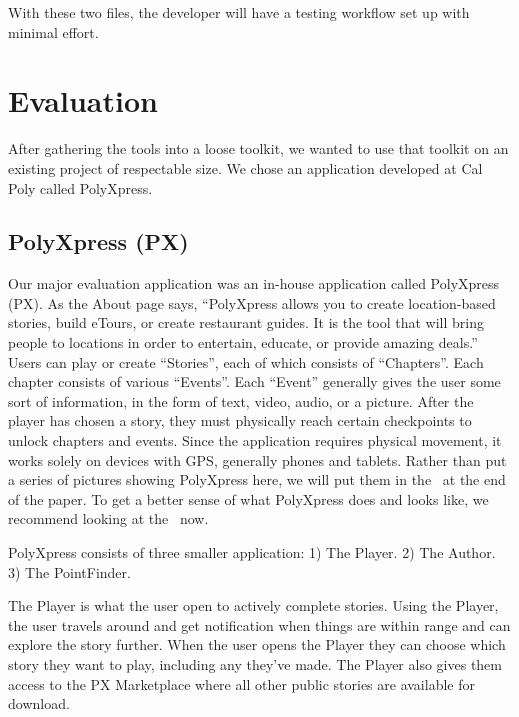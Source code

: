 \documentclass[12pt]{ucthesis}
\begin{document}
With these two files, the developer will have a testing workflow set up with minimal effort.


\chapter{Evaluation}
After gathering the tools into a loose toolkit, we wanted to use that toolkit on an existing project of respectable size. We chose an application developed at Cal Poly called PolyXpress.

\section{PolyXpress (PX)}
Our major evaluation application was an in-house application called PolyXpress (PX)\cite{PX}. As the About page says, ``PolyXpress allows you to create location-based stories, build eTours, or create restaurant guides. It is the tool that will bring people to locations in order to entertain, educate, or provide amazing deals.''\cite{PX} Users can play or create ``Stories'', each of which consists of ``Chapters''. Each chapter consists of various ``Events''. Each ``Event'' generally gives the user some sort of information, in the form of text, video, audio, or a picture. After the player has chosen a story, they must physically reach certain checkpoints to unlock chapters and events. Since the application requires physical movement, it works solely on devices with GPS, generally phones and tablets. Rather than put a series of pictures showing PolyXpress here, we will put them in the~ at the end of the paper. To get a better sense of what PolyXpress does and looks like, we recommend looking at the~ now.

PolyXpress consists of three smaller application: 1) The Player. 2) The Author. 3) The PointFinder.

The Player is what the user open to actively complete stories. Using the Player, the user travels around and get notification when things are within range and can explore the story further. When the user opens the Player they can choose which story they want to play, including any they've made. The Player also gives them access to the PX Marketplace where all other public stories are available for download.
\end{document}
